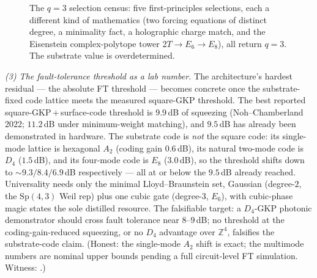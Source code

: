 \documentclass[11pt]{article}
\begin{document}
\begin{figure}[ht]\centering
{}
\caption{The $q=3$ selection census: five first-principles selections, each a
different kind of mathematics (two forcing equations of distinct degree, a
minimality fact, a holographic charge match, and the Eisenstein complex-polytope
tower $2T\!\to\!E_6\!\to\!E_8$), all return $q=3$. The substrate value is
overdetermined.}
\label{fig:q3-census}
\end{figure}

\emph{(3) The fault-tolerance threshold as a lab number.} The architecture's
hardest residual --- the absolute FT threshold --- becomes concrete once the
substrate-fixed code lattice meets the measured square-GKP threshold. The best
reported square-GKP\,$+$\,surface-code threshold is $9.9$\,dB of squeezing
(Noh--Chamberland 2022; $11.2$\,dB under minimum-weight matching), and $9.5$\,dB
has already been demonstrated in hardware. The substrate code is \emph{not} the
square code: its single-mode lattice is hexagonal $A_2$ (coding gain $0.6$\,dB),
its natural two-mode code is $D_4$ ($1.5$\,dB), and its four-mode code is $E_8$
($3.0$\,dB), so the threshold shifts down to $\sim9.3/8.4/6.9$\,dB respectively ---
all at or below the $9.5$\,dB already reached. Universality needs only the minimal
Lloyd--Braunstein set, Gaussian (degree-$2$, the $\mathrm{Sp}(4,3)$ Weil rep) plus
one cubic gate (degree-$3$, $E_6$), with cubic-phase magic states the sole
distilled resource. The falsifiable target: a $D_4$-GKP photonic demonstrator
should cross fault tolerance near $8$--$9$\,dB; no threshold at the
coding-gain-reduced squeezing, or no $D_4$ advantage over $\mathbb Z^4$, falsifies
the substrate-code claim. (Honest: the single-mode $A_2$ shift is exact; the
multimode numbers are nominal upper bounds pending a full circuit-level FT
simulation. Witness: .)
\end{document}
